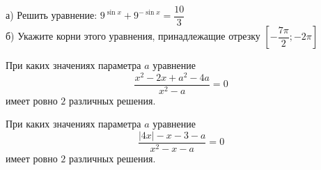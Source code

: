 \begin{class}[number=8]
	\begin{listofex}
		\item а) Решить уравнение: \( 9^{\sin x}+9^{-\sin x}=\dfrac{10}{3} \)\\
		б) Укажите корни этого уравнения, принадлежащие отрезку \( \left[ -\dfrac{7\pi}{2};-2\pi \right] \)
		\item При каких значениях параметра \( a \) уравнение
		\[ \dfrac{x^2-2x+a^2-4a}{x^2-a}=0 \]
		имеет ровно \( 2 \) различных решения.
		\item При каких значениях параметра \( a \) уравнение
		\[ \dfrac{|4x|-x-3-a}{x^2-x-a}=0 \]
		имеет ровно \( 2 \) различных решения.
	\end{listofex}
\end{class}
